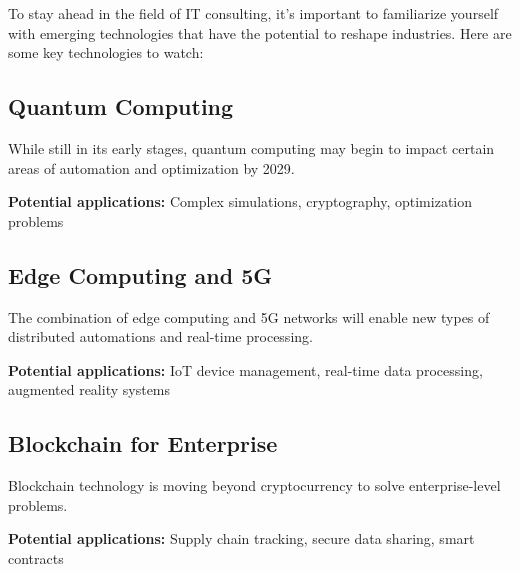 To stay ahead in the field of IT consulting, it's important to familiarize yourself with emerging technologies that have the potential to reshape industries. Here are some key technologies to watch:

\subsection{Quantum Computing}

While still in its early stages, quantum computing may begin to impact certain areas of automation and optimization by 2029.

\textbf{Potential applications:} Complex simulations, cryptography, optimization problems

\subsection{Edge Computing and 5G}

The combination of edge computing and 5G networks will enable new types of distributed automations and real-time processing.

\textbf{Potential applications:} IoT device management, real-time data processing, augmented reality systems

\subsection{Blockchain for Enterprise}

Blockchain technology is moving beyond cryptocurrency to solve enterprise-level problems.

\textbf{Potential applications:} Supply chain tracking, secure data sharing, smart contracts

